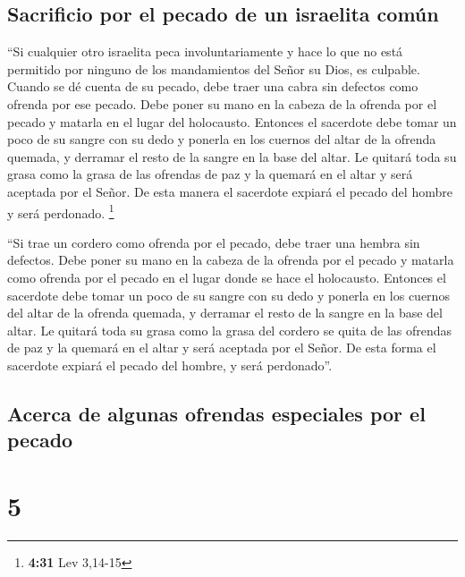 \hypertarget{sacrificio-por-el-pecado-de-un-israelita-comuxfan}{%
\subsection{Sacrificio por el pecado de un israelita
común}\label{sacrificio-por-el-pecado-de-un-israelita-comuxfan}}

 ``Si cualquier otro israelita peca involuntariamente y
hace lo que no está permitido por ninguno de los mandamientos del Señor
su Dios, es culpable.  Cuando se dé cuenta de su pecado,
debe traer una cabra sin defectos como ofrenda por ese pecado.
 Debe poner su mano en la cabeza de la ofrenda por el
pecado y matarla en el lugar del holocausto.  Entonces el
sacerdote debe tomar un poco de su sangre con su dedo y ponerla en los
cuernos del altar de la ofrenda quemada, y derramar el resto de la
sangre en la base del altar.  Le quitará toda su grasa
como la grasa de las ofrendas de paz y la quemará en el altar y será
aceptada por el Señor. De esta manera el sacerdote expiará el pecado del
hombre y será perdonado. \footnote{\textbf{4:31} Lev 3,14-15}

 ``Si trae un cordero como ofrenda por el pecado, debe
traer una hembra sin defectos.  Debe poner su mano en la
cabeza de la ofrenda por el pecado y matarla como ofrenda por el pecado
en el lugar donde se hace el holocausto.  Entonces el
sacerdote debe tomar un poco de su sangre con su dedo y ponerla en los
cuernos del altar de la ofrenda quemada, y derramar el resto de la
sangre en la base del altar.  Le quitará toda su grasa
como la grasa del cordero se quita de las ofrendas de paz y la quemará
en el altar y será aceptada por el Señor. De esta forma el sacerdote
expiará el pecado del hombre, y será perdonado''.

\hypertarget{acerca-de-algunas-ofrendas-especiales-por-el-pecado}{%
\subsection{Acerca de algunas ofrendas especiales por el
pecado}\label{acerca-de-algunas-ofrendas-especiales-por-el-pecado}}

\hypertarget{section-4}{%
\section{5}\label{section-4}}

